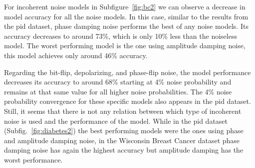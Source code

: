 For incoherent noise models in Subfigure~\ref{fig:bc2}
we can observe a decrease in model accuracy for all the noise
models. In this case, similar to the results from the \ac{pid}
dataset, phase damping noise performs the best of any noise
models. Its accuracy decreases to around 73\%, which is only
10\% less than the noiseless model. The worst performing model
is the one using amplitude damping noise, this model achieves
only around 46\% accuracy. \

Regarding the bit-flip, depolarizing, and phase-flip noise, the model
performance decreases its accuracy to around 68\% starting at
4\% noise probability and remains at that same value for all
higher noise probabilities. The 4\% noise probability convergence
for these specific models also appears in the \ac{pid} dataset. Still,
it seems that there is not any relation between which type of incoherent noise
is used and the performance of the model. While in the \ac{pid}
dataset (Subfig.~\ref{fig:diabetes2}) the best performing models
were the ones using phase and amplitude damping noise, in the
Wisconsin Breast Cancer dataset phase damping noise has again the
highest accuracy but amplitude damping has the worst performance. \

